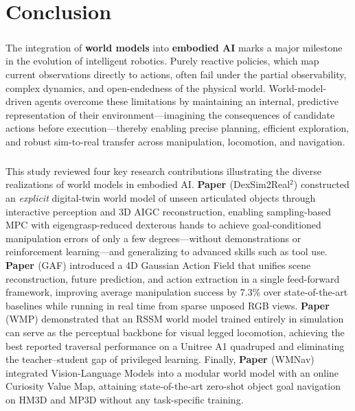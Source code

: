 \documentclass[12pt,a4paper,final]{extreport}
\begin{document}
\chapter{Conclusion}

\paragraph{}
The integration of \textbf{world models} into \textbf{embodied AI} marks a major milestone in the evolution of intelligent robotics. Purely reactive policies, which map current observations directly to actions, often fail under the partial observability, complex dynamics, and open-endedness of the physical world. World-model-driven agents overcome these limitations by maintaining an internal, predictive representation of their environment---imagining the consequences of candidate actions before execution---thereby enabling precise planning, efficient exploration, and robust sim-to-real transfer across manipulation, locomotion, and navigation.

\paragraph{}
This study reviewed four key research contributions illustrating the diverse realizations of world models in embodied AI.
\textbf{Paper \cite{p1}} (DexSim2Real$^2$) constructed an \textit{explicit} digital-twin world model of unseen articulated objects through interactive perception and 3D AIGC reconstruction, enabling sampling-based MPC with eigengrasp-reduced dexterous hands to achieve goal-conditioned manipulation errors of only a few degrees---without demonstrations or reinforcement learning---and generalizing to advanced skills such as tool use.
\textbf{Paper \cite{p2}} (GAF) introduced a 4D Gaussian Action Field that unifies scene reconstruction, future prediction, and action extraction in a single feed-forward framework, improving average manipulation success by 7.3\% over state-of-the-art baselines while running in real time from sparse unposed RGB views.
\textbf{Paper \cite{p3}} (WMP) demonstrated that an RSSM world model trained entirely in simulation can serve as the perceptual backbone for visual legged locomotion, achieving the best reported traversal performance on a Unitree A1 quadruped and eliminating the teacher--student gap of privileged learning.
Finally, \textbf{Paper \cite{p4}} (WMNav) integrated Vision-Language Models into a modular world model with an online Curiosity Value Map, attaining state-of-the-art zero-shot object goal navigation on HM3D and MP3D without any task-specific training.
\end{document}

